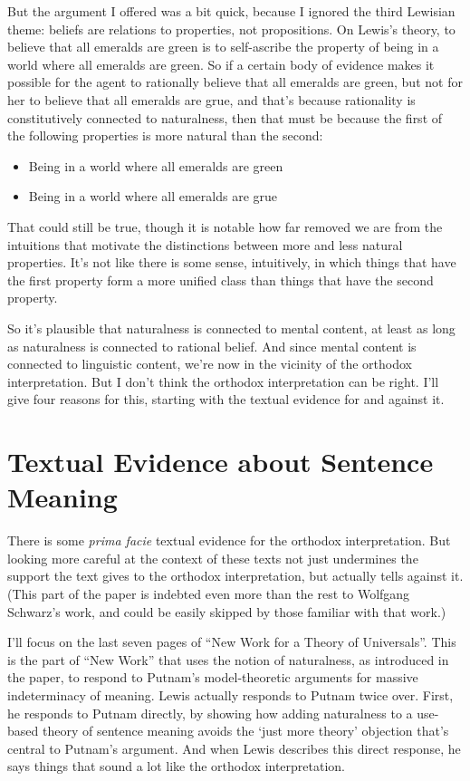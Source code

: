 \documentclass[
  10pt,
  letterpaper,
  DIV=11,
  numbers=noendperiod,
  twoside]{scrartcl}
\providecommand{\tightlist}{%
  \setlength{\itemsep}{0pt}\setlength{\parskip}{0pt}}\usepackage{longtable,booktabs,array}
\begin{document}
But the argument I offered was a bit quick, because I ignored the third
Lewisian theme: beliefs are relations to properties, not propositions.
On Lewis's theory, to believe that all emeralds are green is to
self-ascribe the property of being in a world where all emeralds are
green. So if a certain body of evidence makes it possible for the agent
to rationally believe that all emeralds are green, but not for her to
believe that all emeralds are grue, and that's because rationality is
constitutively connected to naturalness, then that must be because the
first of the following properties is more natural than the second:

\begin{itemize}
\tightlist
\item
  Being in a world where all emeralds are green
\item
  Being in a world where all emeralds are grue
\end{itemize}

That could still be true, though it is notable how far removed we are
from the intuitions that motivate the distinctions between more and less
natural properties. It's not like there is some sense, intuitively, in
which things that have the first property form a more unified class than
things that have the second property.

So it's plausible that naturalness is connected to mental content, at
least as long as naturalness is connected to rational belief. And since
mental content is connected to linguistic content, we're now in the
vicinity of the orthodox interpretation. But I don't think the orthodox
interpretation can be right. I'll give four reasons for this, starting
with the textual evidence for and against it.

\section{Textual Evidence about Sentence
Meaning}\label{textual-evidence-about-sentence-meaning}

There is some \emph{prima facie} textual evidence for the orthodox
interpretation. But looking more careful at the context of these texts
not just undermines the support the text gives to the orthodox
interpretation, but actually tells against it. (This part of the paper
is indebted even more than the rest to Wolfgang Schwarz's work, and
could be easily skipped by those familiar with that work.)

I'll focus on the last seven pages of ``New Work for a Theory of
Universals''. This is the part of ``New Work'' that uses the notion of
naturalness, as introduced in the paper, to respond to Putnam's
model-theoretic arguments for massive indeterminacy of meaning. Lewis
actually responds to Putnam twice over. First, he responds to Putnam
directly, by showing how adding naturalness to a use-based theory of
sentence meaning avoids the `just more theory' objection that's central
to Putnam's argument. And when Lewis describes this direct response, he
says things that sound a lot like the orthodox interpretation.
\end{document}
